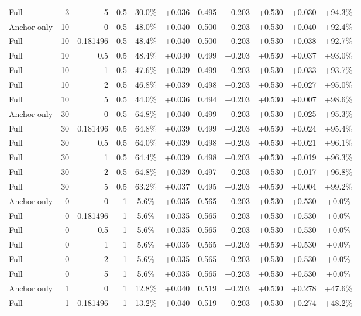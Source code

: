\begin{table}[htbp]
\begin{tabular}{lrrrccccccc}
Full & 3 & 5 & 0.5 & 30.0\% & +0.036 & 0.495 & +0.203 & +0.530 & +0.030 & +94.3\% \\
Anchor only & 10 & 0 & 0.5 & 48.0\% & +0.040 & 0.500 & +0.203 & +0.530 & +0.040 & +92.4\% \\
Full & 10 & 0.181496 & 0.5 & 48.4\% & +0.040 & 0.500 & +0.203 & +0.530 & +0.038 & +92.7\% \\
Full & 10 & 0.5 & 0.5 & 48.4\% & +0.040 & 0.499 & +0.203 & +0.530 & +0.037 & +93.0\% \\
Full & 10 & 1 & 0.5 & 47.6\% & +0.039 & 0.499 & +0.203 & +0.530 & +0.033 & +93.7\% \\
Full & 10 & 2 & 0.5 & 46.8\% & +0.039 & 0.498 & +0.203 & +0.530 & +0.027 & +95.0\% \\
Full & 10 & 5 & 0.5 & 44.0\% & +0.036 & 0.494 & +0.203 & +0.530 & +0.007 & +98.6\% \\
Anchor only & 30 & 0 & 0.5 & 64.8\% & +0.040 & 0.499 & +0.203 & +0.530 & +0.025 & +95.3\% \\
Full & 30 & 0.181496 & 0.5 & 64.8\% & +0.039 & 0.499 & +0.203 & +0.530 & +0.024 & +95.4\% \\
Full & 30 & 0.5 & 0.5 & 64.0\% & +0.039 & 0.498 & +0.203 & +0.530 & +0.021 & +96.1\% \\
Full & 30 & 1 & 0.5 & 64.4\% & +0.039 & 0.498 & +0.203 & +0.530 & +0.019 & +96.3\% \\
Full & 30 & 2 & 0.5 & 64.8\% & +0.039 & 0.497 & +0.203 & +0.530 & +0.017 & +96.8\% \\
Full & 30 & 5 & 0.5 & 63.2\% & +0.037 & 0.495 & +0.203 & +0.530 & +0.004 & +99.2\% \\
Anchor only & 0 & 0 & 1 & 5.6\% & +0.035 & 0.565 & +0.203 & +0.530 & +0.530 & +0.0\% \\
Full & 0 & 0.181496 & 1 & 5.6\% & +0.035 & 0.565 & +0.203 & +0.530 & +0.530 & +0.0\% \\
Full & 0 & 0.5 & 1 & 5.6\% & +0.035 & 0.565 & +0.203 & +0.530 & +0.530 & +0.0\% \\
Full & 0 & 1 & 1 & 5.6\% & +0.035 & 0.565 & +0.203 & +0.530 & +0.530 & +0.0\% \\
Full & 0 & 2 & 1 & 5.6\% & +0.035 & 0.565 & +0.203 & +0.530 & +0.530 & +0.0\% \\
Full & 0 & 5 & 1 & 5.6\% & +0.035 & 0.565 & +0.203 & +0.530 & +0.530 & +0.0\% \\
Anchor only & 1 & 0 & 1 & 12.8\% & +0.040 & 0.519 & +0.203 & +0.530 & +0.278 & +47.6\% \\
Full & 1 & 0.181496 & 1 & 13.2\% & +0.040 & 0.519 & +0.203 & +0.530 & +0.274 & +48.2\% \\

\end{tabular}
\end{table}
